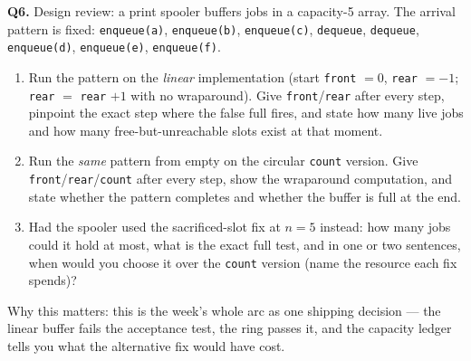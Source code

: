 \documentclass[11pt]{article}
\begin{document}
\textbf{Q6.} Design review: a print spooler buffers jobs in a capacity-5 array. The arrival pattern is fixed: \texttt{enqueue(a)}, \texttt{enqueue(b)}, \texttt{enqueue(c)}, \texttt{dequeue}, \texttt{dequeue}, \texttt{enqueue(d)}, \texttt{enqueue(e)}, \texttt{enqueue(f)}.
\begin{enumerate}
  \item[(a)] Run the pattern on the \emph{linear} implementation (start \texttt{front} $= 0$, \texttt{rear} $= -1$; \texttt{rear} $=$ \texttt{rear} $+ 1$ with no wraparound). Give \texttt{front}/\texttt{rear} after every step, pinpoint the exact step where the false full fires, and state how many live jobs and how many free-but-unreachable slots exist at that moment.
  \item[(b)] Run the \emph{same} pattern from empty on the circular \texttt{count} version. Give \texttt{front}/\texttt{rear}/\texttt{count} after every step, show the wraparound computation, and state whether the pattern completes and whether the buffer is full at the end.
  \item[(c)] Had the spooler used the sacrificed-slot fix at $n = 5$ instead: how many jobs could it hold at most, what is the exact full test, and in one or two sentences, when would you choose it over the \texttt{count} version (name the resource each fix spends)?
\end{enumerate}
Why this matters: this is the week's whole arc as one shipping decision --- the linear buffer fails the acceptance test, the ring passes it, and the capacity ledger tells you what the alternative fix would have cost.



\end{document}
